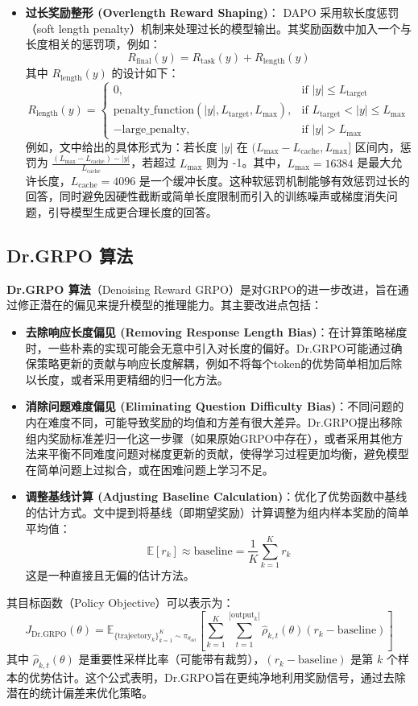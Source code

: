 \documentclass{article}
\begin{document}
\begin{itemize}
    \item \textbf{过长奖励整形 (Overlength Reward Shaping)}：
    DAPO 采用软长度惩罚（soft length penalty）机制来处理过长的模型输出。其奖励函数中加入一个与长度相关的惩罚项，例如：
    \[
    R_{\text{final}}(y) = R_{\text{task}}(y) + R_{\text{length}}(y)
    \]
    其中 $R_{\text{length}}(y)$ 的设计如下：
    \[
    R_{\text{length}}(y) = \begin{cases}
    0, & \text{if } |y| \leq L_{\text{target}} \\
    \text{penalty_function}(|y|, L_{\text{target}}, L_{\text{max}}), & \text{if } L_{\text{target}} < |y| \leq L_{\text{max}} \\
    -\text{large\_penalty}, & \text{if } |y| > L_{\text{max}}
    \end{cases}
    \]
    例如，文中给出的具体形式为：若长度 $|y|$ 在 $(L_{\text{max}} - L_{\text{cache}}, L_{\text{max}}]$ 区间内，惩罚为 $\frac{(L_{\text{max}} - L_{\text{cache}}) - |y|}{L_{\text{cache}}}$，若超过 $L_{\text{max}}$ 则为 -1。其中，$L_{\text{max}} = 16384$ 是最大允许长度，$L_{\text{cache}} = 4096$ 是一个缓冲长度。这种软惩罚机制能够有效惩罚过长的回答，同时避免因硬性截断或简单长度限制而引入的训练噪声或梯度消失问题，引导模型生成更合理长度的回答。
\end{itemize}

\subsection{Dr.GRPO 算法}
\textbf{Dr.GRPO 算法}\cite{liu2025understanding}（Denoising Reward GRPO）是对GRPO的进一步改进，旨在通过修正潜在的偏见来提升模型的推理能力。其主要改进点包括：
\begin{itemize}
    \item \textbf{去除响应长度偏见 (Removing Response Length Bias)}：在计算策略梯度时，一些朴素的实现可能会无意中引入对长度的偏好。Dr.GRPO可能通过确保策略更新的贡献与响应长度解耦，例如不将每个token的优势简单相加后除以长度，或者采用更精细的归一化方法。
    \item \textbf{消除问题难度偏见 (Eliminating Question Difficulty Bias)}：不同问题的内在难度不同，可能导致奖励的均值和方差有很大差异。Dr.GRPO提出移除组内奖励标准差归一化这一步骤（如果原始GRPO中存在），或者采用其他方法来平衡不同难度问题对梯度更新的贡献，使得学习过程更加均衡，避免模型在简单问题上过拟合，或在困难问题上学习不足。
    \item \textbf{调整基线计算 (Adjusting Baseline Calculation)}：优化了优势函数中基线的估计方式。文中提到将基线（即期望奖励）计算调整为组内样本奖励的简单平均值：
    \[
    \mathbb{E}[r_k] \approx \text{baseline} = \frac{1}{K} \sum_{k=1}^K r_k
    \]
    这是一种直接且无偏的估计方法。
\end{itemize}
其目标函数（Policy Objective）可以表示为：
\[
J_{\text{Dr.GRPO}}(\theta) = \mathbb{E}_{\{\text{trajectory}_k\}_{k=1}^K \sim \pi_{\theta_{\text{old}}}}\left[\sum_{k=1}^{K} \sum_{t=1}^{|\text{output}_k|} \hat{\rho}_{k,t}(\theta) (r_k - \text{baseline})\right]
\]
其中 $\hat{\rho}_{k,t}(\theta)$ 是重要性采样比率（可能带有裁剪），$(r_k - \text{baseline})$ 是第 $k$ 个样本的优势估计。这个公式表明，Dr.GRPO旨在更纯净地利用奖励信号，通过去除潜在的统计偏差来优化策略。
\end{document}
